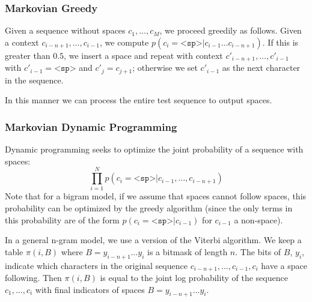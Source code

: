 \documentclass[11pt]{article}
\begin{document}
\subsubsection{Markovian Greedy}

%

Given a sequence without spaces $c_1, \ldots, c_M$, we proceed greedily as follows. Given a context $c_{i-n+1}, \ldots, c_{i-1}$, we compute $p(c_i = \texttt{<sp>} | c_{i-1} \ldots c_{i-n+1})$. If this is greater than $0.5$, we insert a space and repeat with context $c'_{i-n+1}, \ldots, c'_{i-1}$ with $c'_{i-1} = \texttt{<sp>}$ and $c'_j = c_{j+1}$; otherwise we set $c'_{i-1}$ as the next character in the sequence.

In this manner we can process the entire test sequence to output spaces.

\subsubsection{Markovian Dynamic Programming}

Dynamic programming seeks to optimize the joint probability of a sequence with spaces:
$$\prod_{i=1}^{N} p(c_i = \texttt{<sp>} | c_{i-1}, \ldots, c_{i-n+1})$$
Note that for a bigram model, if we assume that spaces cannot follow spaces, this probability can be optimized by the greedy algorithm (since the only terms in this probability are of the form $p(c_i = \texttt{<sp>} | c_{i-1})$ for $c_{i-1}$ a non-space).

In a general n-gram model, we use a version of the Viterbi algorithm. We keep a table $\pi(i, B)$ where $B = y_{i-n+1} \ldots y_i$ is a bitmask of length $n$. The bits of $B$, $y_i$, indicate which characters in the original sequence $c_{i-n+1}, \ldots, c_{i-1}, c_i$ have a space following. Then $\pi(i, B)$ is equal to the joint log probability of the sequence $c_1, \ldots, c_i$ with final indicators of spaces $B = y_{i-n+1} \ldots y_i$.
\end{document}

